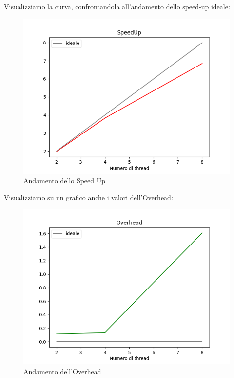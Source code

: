 \newpage
Visualizziamo la curva, confrontandola all'andamento dello speed-up ideale:
\begin{figure}[h!tbp]
    \centering
    \includegraphics[width=1\linewidth]{speedup.png}
    \caption{Andamento dello Speed Up}
    \label{fig:enter-label}
\end{figure}
\clearpage
Visualizziamo su un grafico anche i valori dell'Overhead:

\begin{figure}[h!tbp]
    \centering
    \includegraphics[width=1\linewidth]{overhead.png}
    \caption{Andamento dell'Overhead}
    \label{fig:enter-label}
\end{figure}

